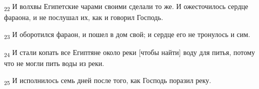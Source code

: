\begin{tcolorbox}
\textsubscript{22} И волхвы Египетские чарами своими сделали то же. И ожесточилось сердце фараона, и не послушал их, как и говорил Господь.
\end{tcolorbox}
\begin{tcolorbox}
\textsubscript{23} И оборотился фараон, и пошел в дом свой; и сердце его не тронулось и сим.
\end{tcolorbox}
\begin{tcolorbox}
\textsubscript{24} И стали копать все Египтяне около реки [чтобы найти] воду для питья, потому что не могли пить воды из реки.
\end{tcolorbox}
\begin{tcolorbox}
\textsubscript{25} И исполнилось семь дней после того, как Господь поразил реку.
\end{tcolorbox}

